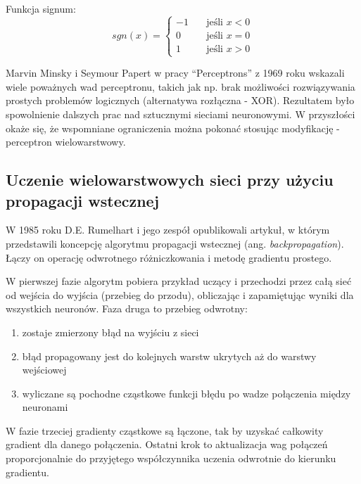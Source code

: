 \documentclass[a4paper,11pt]{article}
\begin{document}
    \noindent
    \begin{minipage}[H]{\textwidth}
        \setlength\parindent{17pt} Funkcja signum: \\
        \begin{equation}
            \label{eq:signum}
            sgn(x) =
            \begin{cases}
                -1 & \quad \text{jeśli } x < 0 \\
                0 & \quad \text{jeśli } x = 0 \\
                1 & \quad \text{jeśli } x > 0
            \end{cases}
        \end{equation}
    \end{minipage}

    \bigskip

    Marvin Minsky i Seymour Papert w pracy ``Perceptrons'' z 1969 roku wskazali wiele poważnych wad perceptronu, takich jak np. brak możliwości rozwiązywania prostych problemów logicznych (alternatywa rozłączna - XOR). Rezultatem było spowolnienie dalszych prac nad sztucznymi sieciami neuronowymi. W przyszłości okaże się, że wspomniane ograniczenia można pokonać stosując modyfikację - perceptron wielowarstwowy\cite{UczenieMaszynowe2018}.

    \subsection{Uczenie wielowarstwowych sieci przy użyciu propagacji wstecznej}

    W 1985 roku D.E. Rumelhart i jego zespół opublikowali artykuł\cite{Backpropagation1985}, w którym przedstawili koncepcję algorytmu propagacji wstecznej (ang. \textit{backpropagation}).
    Łączy on operację odwrotnego różniczkowania i metodę gradientu prostego.

    \bigskip

    W pierwszej fazie algorytm pobiera przykład uczący i przechodzi przez całą sieć od wejścia do wyjścia (przebieg do przodu), obliczając i zapamiętując wyniki dla wszystkich neuronów.
    \smallskip
    Faza druga to przebieg odwrotny:
    \begin{enumerate}
        \item zostaje zmierzony błąd na wyjściu z sieci
        \item błąd propagowany jest do kolejnych warstw ukrytych aż do warstwy wejściowej
        \item wyliczane są pochodne cząstkowe funkcji błędu po wadze połączenia między neuronami
    \end{enumerate}
    \smallskip
    W fazie trzeciej gradienty cząstkowe są łączone, tak by uzyskać całkowity gradient dla danego połączenia.
    \smallskip
    Ostatni krok to aktualizacja wag połączeń proporcjonalnie do przyjętego współczynnika uczenia odwrotnie do kierunku gradientu\cite{BackpropagationBrilliant}.
\end{document}
